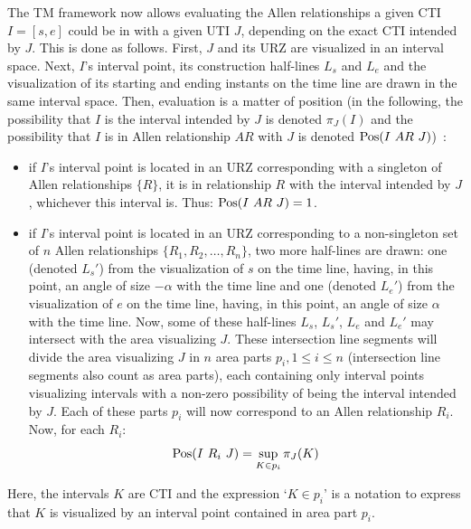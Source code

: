 \vspace{-5pt}
The TM framework now allows evaluating the Allen relationships a given CTI $I = \left[s, e\right]$ could be in with a given UTI $J$, depending on the exact CTI intended by $J$. This is done as follows. First, $J$ and its URZ are visualized in an interval space. Next, $I$'s interval point, its construction half-lines $L_s$ and $L_e$ and the visualization of its starting and ending instants on the time line are drawn in the same interval space. Then, evaluation is a matter of position (in the following, the possibility that $I$ is the interval intended by $J$ is denoted $\pi_J(I)$ and the possibility that $I$ is in Allen relationship $AR$ with $J$ is denoted  $\operatorname{Pos}(I\ AR\ J)$)~\cite{DeTre2012}:
\vspace{-5pt}
\begin{itemize}
	\item if $I$'s interval point is located in an URZ corresponding with a singleton of Allen relationships $\{R\}$, it is in relationship $R$ with the interval intended by $J$, whichever this interval is. Thus: $\Pos(I\ AR\ J) = 1$.
	\item if $I$'s interval point is located in an URZ corresponding to a non-singleton set of $n$ Allen relationships $\{R_1, R_2, \ldots, R_n\}$, two more half-lines are drawn: one (denoted $L_s'$) from the visualization of $s$ on the time line, having, in this point, an angle of size $-\alpha$ with the time line and one (denoted $L_e'$) from the visualization of $e$ on the time line, having, in this point, an angle of size $\alpha$ with the time line. Now, some of these half-lines $L_s$, $L_s'$, $L_e$ and $L_e'$ may intersect with the area visualizing $J$. These intersection line segments will divide the area visualizing $J$ in $n$ area parts $p_i, 1 \leq i \leq n$ (intersection line segments also count as area parts), each containing only interval points visualizing intervals with a non-zero possibility of being the interval intended by $J$. Each of these parts $p_i$ will now correspond to an Allen relationship $R_i$. Now, for each $R_i$:
	\begin{equation}
		\operatorname{Pos}(I\ R_i\ J) = \sup_{K \in p_i} \pi_J(K)
	\end{equation}
\end{itemize}

Here, the intervals $K$ are CTI and the expression `$K \in p_i$' is a notation to express that $K$ is visualized by an interval point contained in area part $p_i$.
